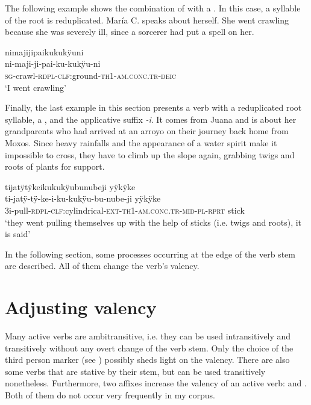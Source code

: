 The following example shows the combination of  with a . In this case, a syllable of the root is reduplicated. María C. speaks about herself. She went crawling because she was severely ill, since a sorcerer had put a spell on her.

\ea\label{ex:act-combi-1}
\begingl
\glpreamble nimajijipaikukukÿuni\\
\gla ni-maji-ji-pai-ku-kukÿu-ni\\
\textsc{sg}-crawl-\textsc{rdpl}-\textsc{clf:}ground-\textsc{th}1-\textsc{am.conc.tr}-\textsc{deic}\\
\glft ‘I went crawling’
\endgl
\trailingcitation{[ump-p110815sf.306]}
\xe

Finally, the last example in this section presents a verb with a reduplicated root syllable, a , and the applicative suffix \textit{-i}. It comes from Juana and is about her grandparents who had arrived at an arroyo on their journey back home from Moxos. Since heavy rainfalls and the appearance of a water spirit make it impossible to cross, they have to climb up the slope again, grabbing twigs and roots of plants for support.

\ea\label{ex:act-combi-2}
\begingl 
\glpreamble tijatÿtÿkeikukukÿubunubeji yÿkÿke\\
\gla ti-jatÿ-tÿ-ke-i-ku-kukÿu-bu-nube-ji yÿkÿke \\ 
\glb 3i-pull-\textsc{rdpl}-\textsc{clf}:cylindrical-\textsc{ext}-\textsc{th}1-\textsc{am.conc.tr}-\textsc{mid}-\textsc{pl}-\textsc{rprt} stick\\ 
\glft ‘they went pulling themselves up with the help of sticks (i.e. twigs and roots), it is said’
\trailingcitation{[jxx-p151016l-2]}
\xe{}

In the following section, some processes occurring at the edge of the verb stem are described. All of them change the verb’s valency.


\section{Adjusting valency}\label{sec:Valency}

Many active verbs are ambitransitive, i.e. they can be used intransitively and transitively without any overt change of the verb stem. Only the choice of the third person marker (see ) possibly sheds light on the valency. There are also some verbs that are stative by their stem, but can be used transitively nonetheless. Furthermore, two affixes increase the valency of an active verb:  and . Both of them do not occur very frequently in my corpus.

